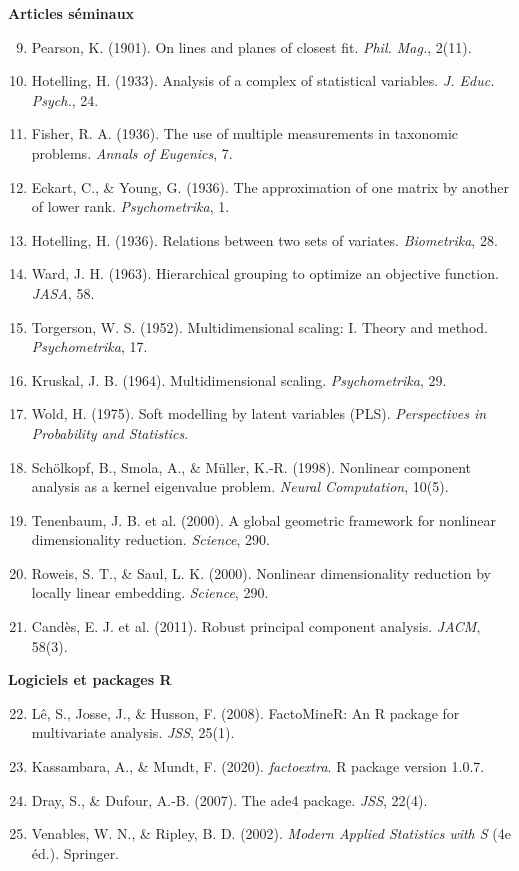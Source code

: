 \documentclass[11pt, a4paper, openany]{book}
\theoremstyle{plain}
\theoremstyle{definition}
\theoremstyle{remark}
\newcommand{\1}{\mathds{1}}
\begin{document}
\textbf{Articles séminaux}
\begin{enumerate}
  \setcounter{enumi}{8}
  \item Pearson, K. (1901). On lines and planes of closest fit. \textit{Phil. Mag.}, 2(11).
  \item Hotelling, H. (1933). Analysis of a complex of statistical variables. \textit{J. Educ. Psych.}, 24.
  \item Fisher, R. A. (1936). The use of multiple measurements in taxonomic problems. \textit{Annals of Eugenics}, 7.
  \item Eckart, C., \& Young, G. (1936). The approximation of one matrix by another of lower rank. \textit{Psychometrika}, 1.
  \item Hotelling, H. (1936). Relations between two sets of variates. \textit{Biometrika}, 28.
  \item Ward, J. H. (1963). Hierarchical grouping to optimize an objective function. \textit{JASA}, 58.
  \item Torgerson, W. S. (1952). Multidimensional scaling: I. Theory and method. \textit{Psychometrika}, 17.
  \item Kruskal, J. B. (1964). Multidimensional scaling. \textit{Psychometrika}, 29.
  \item Wold, H. (1975). Soft modelling by latent variables (PLS). \textit{Perspectives in Probability and Statistics}.
  \item Schölkopf, B., Smola, A., \& Müller, K.-R. (1998). Nonlinear component analysis as a kernel eigenvalue problem. \textit{Neural Computation}, 10(5).
  \item Tenenbaum, J. B. et al. (2000). A global geometric framework for nonlinear dimensionality reduction. \textit{Science}, 290.
  \item Roweis, S. T., \& Saul, L. K. (2000). Nonlinear dimensionality reduction by locally linear embedding. \textit{Science}, 290.
  \item Candès, E. J. et al. (2011). Robust principal component analysis. \textit{JACM}, 58(3).
\end{enumerate}

\textbf{Logiciels et packages R}
\begin{enumerate}
  \setcounter{enumi}{21}
  \item Lê, S., Josse, J., \& Husson, F. (2008). FactoMineR: An R package for multivariate analysis. \textit{JSS}, 25(1).
  \item Kassambara, A., \& Mundt, F. (2020). \textit{factoextra}. R package version 1.0.7.
  \item Dray, S., \& Dufour, A.-B. (2007). The ade4 package. \textit{JSS}, 22(4).
  \item Venables, W. N., \& Ripley, B. D. (2002). \textit{Modern Applied Statistics with S} (4e éd.). Springer.
\end{enumerate}
\end{document}
